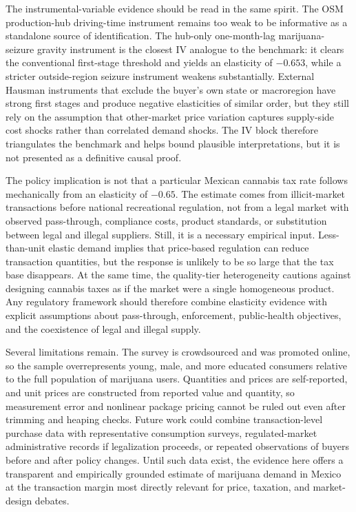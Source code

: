 The instrumental-variable evidence should be read in the same spirit.  The OSM production-hub driving-time instrument remains too weak to be informative as a standalone source of identification.  The hub-only one-month-lag marijuana-seizure gravity instrument is the closest IV analogue to the benchmark: it clears the conventional first-stage threshold and yields an elasticity of $-0.653$, while a stricter outside-region seizure instrument weakens substantially.  External Hausman instruments that exclude the buyer's own state or macroregion have strong first stages and produce negative elasticities of similar order, but they still rely on the assumption that other-market price variation captures supply-side cost shocks rather than correlated demand shocks.  The IV block therefore triangulates the benchmark and helps bound plausible interpretations, but it is not presented as a definitive causal proof.

The policy implication is not that a particular Mexican cannabis tax rate follows mechanically from an elasticity of $-0.65$.  The estimate comes from illicit-market transactions before national recreational regulation, not from a legal market with observed pass-through, compliance costs, product standards, or substitution between legal and illegal suppliers.  Still, it is a necessary empirical input.  Less-than-unit elastic demand implies that price-based regulation can reduce transaction quantities, but the response is unlikely to be so large that the tax base disappears.  At the same time, the quality-tier heterogeneity cautions against designing cannabis taxes as if the market were a single homogeneous product.  Any regulatory framework should therefore combine elasticity evidence with explicit assumptions about pass-through, enforcement, public-health objectives, and the coexistence of legal and illegal supply.

Several limitations remain.  The survey is crowdsourced and was promoted online, so the sample overrepresents young, male, and more educated consumers relative to the full population of marijuana users.  Quantities and prices are self-reported, and unit prices are constructed from reported value and quantity, so measurement error and nonlinear package pricing cannot be ruled out even after trimming and heaping checks.  Future work could combine transaction-level purchase data with representative consumption surveys, regulated-market administrative records if legalization proceeds, or repeated observations of buyers before and after policy changes.  Until such data exist, the evidence here offers a transparent and empirically grounded estimate of marijuana demand in Mexico at the transaction margin most directly relevant for price, taxation, and market-design debates.

